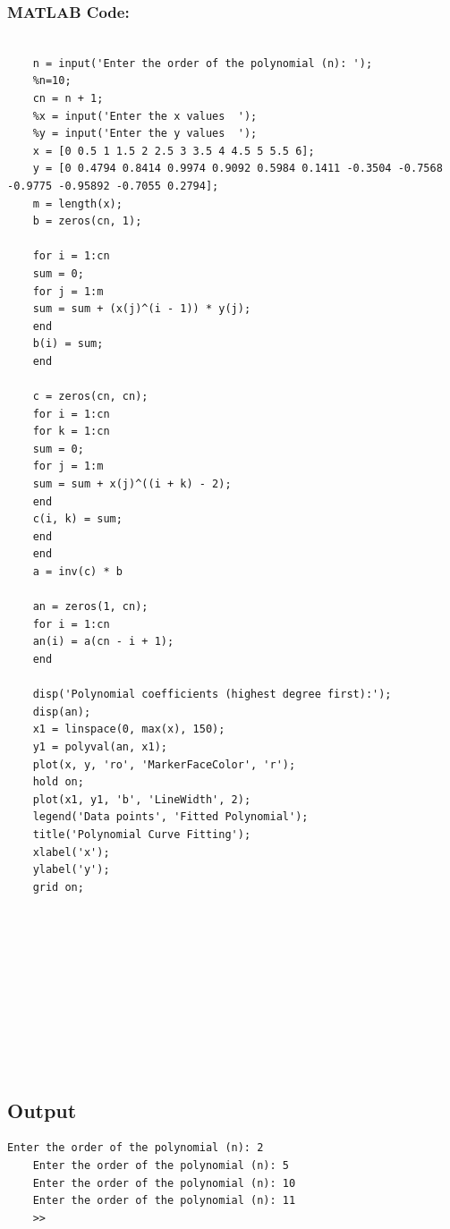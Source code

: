 \documentclass[a4paper,12pt]{article}
\begin{document}
	\subsubsection{MATLAB Code:}
	\begin{lstlisting}[style=vscode-light, caption={MATLAB code for Polynomial Curve Fitting} ]
	
	n = input('Enter the order of the polynomial (n): ');
	%n=10;
	cn = n + 1;
	%x = input('Enter the x values  ');
	%y = input('Enter the y values  ');
	x = [0 0.5 1 1.5 2 2.5 3 3.5 4 4.5 5 5.5 6];   
	y = [0 0.4794 0.8414 0.9974 0.9092 0.5984 0.1411 -0.3504 -0.7568 -0.9775 -0.95892 -0.7055 0.2794];  
	m = length(x);  
	b = zeros(cn, 1);
	
	for i = 1:cn
	sum = 0;
	for j = 1:m
	sum = sum + (x(j)^(i - 1)) * y(j);
	end
	b(i) = sum;
	end
	
	c = zeros(cn, cn);
	for i = 1:cn
	for k = 1:cn
	sum = 0;
	for j = 1:m
	sum = sum + x(j)^((i + k) - 2);
	end
	c(i, k) = sum;
	end
	end
	a = inv(c) * b
	
	an = zeros(1, cn);
	for i = 1:cn
	an(i) = a(cn - i + 1);
	end
	
	disp('Polynomial coefficients (highest degree first):');
	disp(an);
	x1 = linspace(0, max(x), 150);
	y1 = polyval(an, x1);
	plot(x, y, 'ro', 'MarkerFaceColor', 'r'); 
	hold on;
	plot(x1, y1, 'b', 'LineWidth', 2);
	legend('Data points', 'Fitted Polynomial');
	title('Polynomial Curve Fitting');
	xlabel('x');
	ylabel('y');
	grid on;
	
	
	
	
		
		
		
		
		
		
	\end{lstlisting}
	
	\newpage
	
	
	\subsection{Output}
	
	\begin{lstlisting}[style=vscode-light, caption={Command Window} ]
	Enter the order of the polynomial (n): 2
	Enter the order of the polynomial (n): 5
	Enter the order of the polynomial (n): 10
	Enter the order of the polynomial (n): 11
	>> 
	\end{lstlisting}
\end{document}
